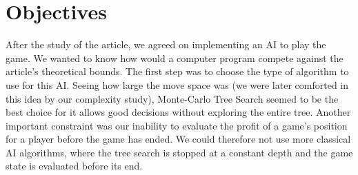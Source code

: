 \section{Objectives}

After the study of the article, we agreed on implementing an AI to play the game. We wanted to know how would a computer program compete against the article's theoretical bounds. The first step was to choose the type of algorithm to use for this AI. Seeing how large the move space was (we were later comforted in this idea by our complexity study), Monte-Carlo Tree Search seemed to be the best choice for it allows good decisions without exploring the entire tree. Another important constraint was our inability to evaluate the profit of a game's position for a player before the game has ended. We could therefore not use more classical AI algorithms, where the tree search is stopped at a constant depth and the game state is evaluated before its end.